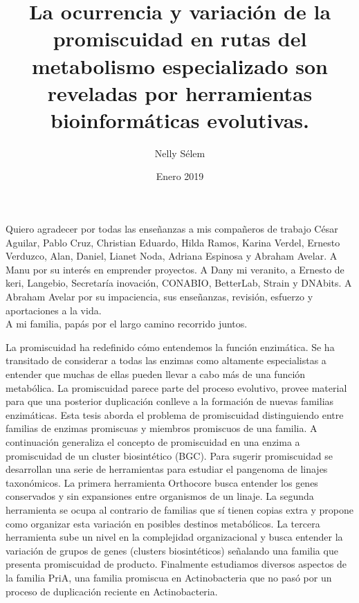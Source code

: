 \documentclass[12pt,twoside]{reedthesis}
\title{La ocurrencia y variación de la promiscuidad en rutas del metabolismo
especializado son reveladas por herramientas bioinformáticas evolutivas.}
\author{Nelly Sélem}
\date{Enero 2019}
\begin{document}
      \maketitle
  
  \frontmatter %
  \pagestyle{empty} %

      \begin{acknowledgements}
      Quiero agradecer por todas las enseñanzas a mis compañeros de trabajo
      César Aguilar, Pablo Cruz, Christian Eduardo, Hilda Ramos, Karina
      Verdel, Ernesto Verduzco, Alan, Daniel, Lianet Noda, Adriana Espinosa y
      Abraham Avelar. A Manu por su interés en emprender proyectos. A Dany mi
      veranito, a Ernesto de keri, Langebio, Secretaría inovación, CONABIO,
      BetterLab, Strain y DNAbits. A Abraham Avelar por su impaciencia, sus
      enseñanzas, revisión, esfuerzo y aportaciones a la vida.\\
      A mi familia, papás por el largo camino recorrido juntos.
    \end{acknowledgements}
  
      \begin{preface}
      La promiscuidad ha redefinido cómo entendemos la función enzimática. Se
      ha transitado de considerar a todas las enzimas como altamente
      especialistas a entender que muchas de ellas pueden llevar a cabo más de
      una función metabólica. La promiscuidad parece parte del proceso
      evolutivo, provee material para que una posterior duplicación conlleve a
      la formación de nuevas familias enzimáticas. Esta tesis aborda el
      problema de promiscuidad distinguiendo entre familias de enzimas
      promiscuas y miembros promiscuos de una familia. A continuación
      generaliza el concepto de promiscuidad en una enzima a promiscuidad de
      un cluster biosintético (BGC). Para sugerir promiscuidad se desarrollan
      una serie de herramientas para estudiar el pangenoma de linajes
      taxonómicos. La primera herramienta Orthocore busca entender los genes
      conservados y sin expansiones entre organismos de un linaje. La segunda
      herramienta se ocupa al contrario de familias que sí tienen copias extra
      y propone como organizar esta variación en posibles destinos
      metabólicos. La tercera herramienta sube un nivel en la complejidad
      organizacional y busca entender la variación de grupos de genes
      (clusters biosintéticos) señalando una familia que presenta promiscuidad
      de producto. Finalmente estudiamos diversos aspectos de la familia PriA,
      una familia promiscua en Actinobacteria que no pasó por un proceso de
      duplicación reciente en Actinobacteria.
    \end{preface}
  
\end{document}
